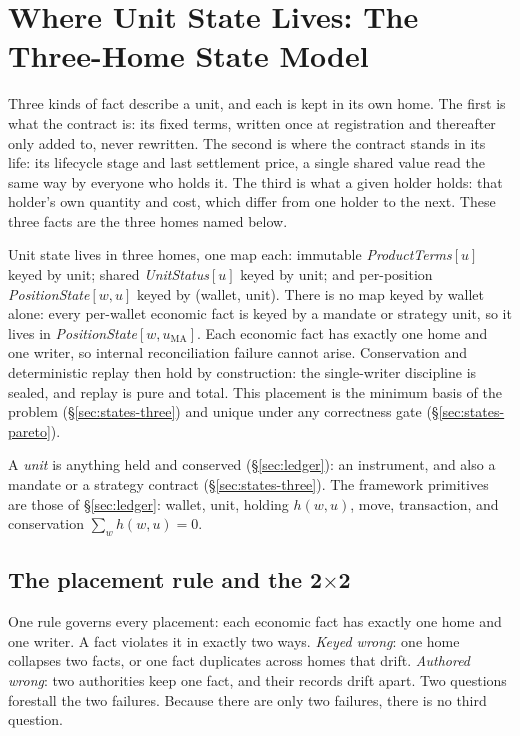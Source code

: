 \section{Where Unit State Lives: The Three-Home State Model}
\label{sec:states}

Three kinds of fact describe a unit, and each is kept in its own home. The first is what
the contract is: its fixed terms, written once at registration and thereafter only added
to, never rewritten. The second is where the contract stands in its life: its lifecycle
stage and last settlement price, a single shared value read the same way by everyone who
holds it. The third is what a given holder holds: that holder's own quantity and cost,
which differ from one holder to the next. These three facts are the three homes named
below.

Unit state lives in three homes, one map each: immutable \emph{ProductTerms}$[u]$
keyed by unit; shared \emph{UnitStatus}$[u]$ keyed by unit; and per-position
\emph{PositionState}$[w,u]$ keyed by (wallet, unit). There is no map keyed by wallet
alone: every per-wallet economic fact is keyed by a mandate or strategy unit, so it
lives in \emph{PositionState}$[w,u_{\mathrm{MA}}]$. Each economic fact has exactly one
home and one writer, so internal reconciliation failure cannot arise. Conservation and
deterministic replay then hold by construction: the single-writer discipline is sealed,
and replay is pure and total. This placement is the minimum basis of
the problem (\S\ref{sec:states-three}) and unique under any correctness gate
(\S\ref{sec:states-pareto}).

A \emph{unit} is anything held and conserved (\S\ref{sec:ledger}): an instrument, and
also a mandate or a strategy contract (\S\ref{sec:states-three}). The framework
primitives are those of \S\ref{sec:ledger}: wallet, unit, holding $h(w,u)$, move,
transaction, and conservation $\sum_{w}h(w,u)=0$.

\subsection{The placement rule and the 2\texorpdfstring{$\times$}{x}2}
\label{sec:states-rule}

One rule governs every placement: each economic fact has exactly one home and one
writer. A fact violates it in exactly two ways. \emph{Keyed wrong}: one home collapses
two facts, or one fact duplicates across homes that drift. \emph{Authored wrong}: two
authorities keep one fact, and their records drift apart. Two questions forestall the
two failures. Because there are only two failures, there is no third question.

